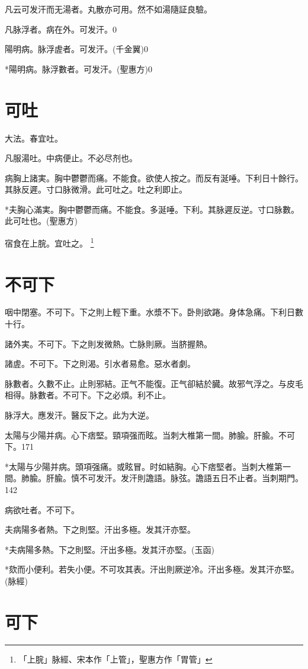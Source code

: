 \documentclass[12pt,twoside,UTF8,b5paper]{ctexbook}
\begin{document}
凡云可发汗而无湯者。丸散亦可用。然不如湯隨証良驗。

凡脉浮者。病在外。可发汗。0

陽明病。脉浮虗者。可发汗。(千金翼)0

*陽明病。脉浮數者。可发汗。(聖惠方)0

\chapter{可吐}

大法。春宜吐。

凡服湯吐。中病便止。不必尽剂也。

病胸上諸実。胸中鬱鬱而痛。不能食。欲使人按之。而反有涎唾。下利日十餘行。其脉反遲。寸口{脉}微滑。此可吐之。吐之利即止。

*夫胸心滿実。胸中鬱鬱而痛。不能食。多涎唾。下利。其脉遲反逆。寸口脉數。此可吐也。(聖惠方)

宿食在上脘。宜吐之。
	\footnote{「上脘」脉經、宋本作「上管」，聖惠方作「胃管」}

\chapter{不可下}

咽中閉塞。不可下。下之則上輕下重。水漿不下。卧則欲踡。身体急痛。下利日數十行。

諸外実。不可下。下之則发微熱。亡脉則厥。当脐握熱。

諸虗。不可下。下之則渴。引水者易愈。惡水者劇。

脉數者。久數不止。止則邪結。正气不能復。正气卻結於臓。故邪气浮之。与皮毛相得。脉數者。不可下。下之必煩。利不止。

脉浮大。應发汗。醫反下之。此为大逆。

太陽与少陽并病。心下痞堅。頸項强而眩。{当刺大椎第一間。肺腧。肝腧。}不可下。171

*太陽与少陽并病。頭項强痛。或眩冒。时如結胸。心下痞堅者。当刺大椎第一間。肺腧。肝腧。慎不可发汗。发汗則譫語。脉弦。譫語五日不止者。当刺期門。142

病欲吐者。不可下。

夫病陽多者熱。下之則堅。汗出多極。发其汗亦堅。

*夫病陽多熱。下之則堅。汗出多極。发其汗亦堅。(玉函)

*欬而小便利。若失小便。不可攻其表。汗出則厥逆冷。汗出多極。发其汗亦堅。(脉經)

\chapter{可下}
\end{document}

